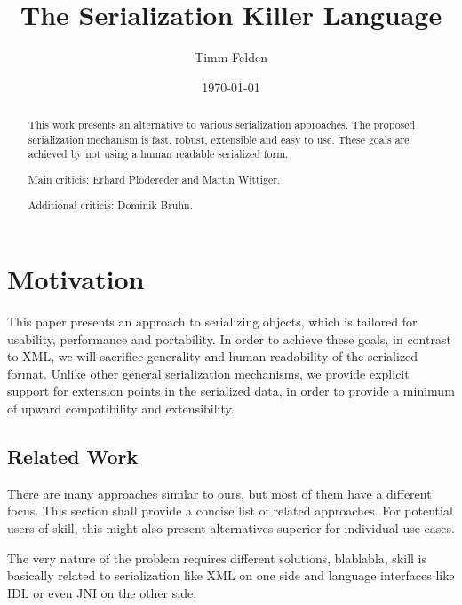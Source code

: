 \documentclass[a4paper,10pt]{article}
\title{The Serialization Killer Language}
\author{Timm Felden}
\date{\today}
\begin{document}
\maketitle

\begin{abstract}
 This work presents an alternative to various serialization approaches. The proposed serialization mechanism is fast, robust, extensible and easy to use. These goals are achieved by not using a human readable serialized form. 
\end{abstract}


\renewcommand{\abstractname}{Acknowledgements}
\begin{abstract}
Main criticis: Erhard Plödereder and Martin Wittiger.

Additional criticis: Dominik Bruhn.
\end{abstract}

\section{Motivation}

This paper presents an approach to serializing objects, which is tailored for usability, performance and portability. In order to achieve these goals, in contrast to XML, we will sacrifice generality and human readability of the serialized format. Unlike other general serialization mechanisms, we provide explicit support for extension points in the serialized data, in order to provide a minimum of upward compatibility and extensibility.

\subsection{Related Work}

There are many approaches similar to ours, but most of them have a different focus. This section shall provide a concise list of related approaches. For potential users of skill, this might also present alternatives superior for individual use cases.

The very nature of the problem requires different solutions, blablabla, skill is basically related to serialization like XML on one side and language interfaces like IDL or even JNI on the other side.
\end{document}
